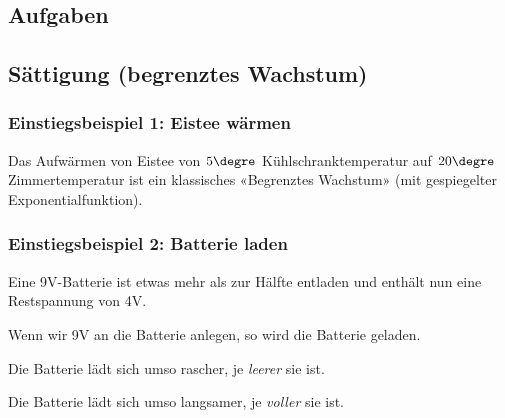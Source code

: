 \subsection*{Aufgaben}



\newpage



\subsection{Sättigung (begrenztes
  Wachstum)}
\subsubsection{Einstiegsbeispiel 1: Eistee wärmen}
Das Aufwärmen von Eistee von $5\degre$ Kühlschranktemperatur auf $20\degre$ Zimmertemperatur ist ein klassisches «Begrenztes Wachstum» (mit gespiegelter Exponentialfunktion).


\subsubsection{Einstiegsbeispiel 2: Batterie laden}
\begin{center}
\end{center}

Eine 9V-Batterie ist etwas mehr als zur Hälfte entladen und enthält nun eine
Restspannung von 4V.

Wenn wir 9V an die Batterie anlegen, so wird die Batterie geladen.

Die Batterie lädt sich umso rascher, je \textit{leerer} sie ist.

Die Batterie lädt sich umso langsamer, je \textit{voller} sie ist.


